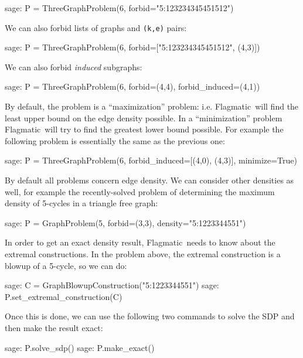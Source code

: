 \documentclass{article}
\providecommand{\flagmatic}{Flagmatic}
\begin{document}
\begin{sage}
sage: P = ThreeGraphProblem(6, forbid="5:123234345451512")
\end{sage}

We can also forbid lists of graphs and \verb|(k,e)| pairs:

\begin{sage}
sage: P = ThreeGraphProblem(6, forbid=["5:123234345451512", (4,3)])
\end{sage}

We can also forbid \emph{induced} subgraphs:

\begin{sage}
sage: P = ThreeGraphProblem(6, forbid=(4,4), forbid_induced=(4,1))
\end{sage}

By default, the problem is a ``maximization'' problem: i.e{.} \flagmatic\ will find the least upper bound on the edge density possible. In a ``minimization'' problem \flagmatic\ will try to find the greatest lower bound possible. For example the following problem is essentially the same as the previous one:

\begin{sage}
sage: P = ThreeGraphProblem(6, forbid_induced=[(4,0), (4,3)], minimize=True)
\end{sage}

By default all problems concern edge density. We can consider other densities as well, for example the recently-solved problem of determining the maximum density of 5-cycles in a triangle free graph:

\begin{sage}
sage: P = GraphProblem(5, forbid=(3,3), density="5:1223344551")
\end{sage}

In order to get an exact density result, \flagmatic\ needs to know about the extremal constructions. In the problem above, the extremal construction is a blowup of a 5-cycle, so we can do:

\begin{sage}
sage: C = GraphBlowupConstruction("5:1223344551")
sage: P.set_extremal_construction(C)
\end{sage}

Once this is done, we can use the following two commands to solve the SDP and then make the result exact:

\begin{sage}
sage: P.solve_sdp()
sage: P.make_exact()
\end{sage}
\end{document}
